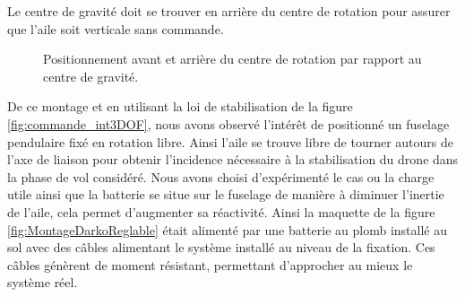 {Le centre de gravité doit se trouver en arrière du centre de rotation pour assurer que l'aile soit verticale sans commande.
\begin{figure}[ht!]
    \centering
    \caption{Positionnement avant et arrière du centre de rotation par rapport au centre de gravité.}
    \label{fig:MontageDarkoReglableAvArr}
\end{figure}

De ce montage et en utilisant la loi de stabilisation de la figure \ref{fig:commande_int3DOF}, nous avons observé l'intérêt de positionné un fuselage pendulaire fixé en rotation libre. Ainsi l'aile se trouve libre de tourner autours de l'axe de liaison pour obtenir l'incidence nécessaire à la stabilisation du drone dans la phase de vol considéré. Nous avons choisi d'expérimenté le cas ou la charge utile ainsi que la batterie se situe sur le fuselage de manière à diminuer l'inertie de l'aile, cela permet d'augmenter sa réactivité. Ainsi la maquette de la figure \ref{fig:MontageDarkoReglable} était alimenté par une batterie au plomb installé au sol avec des câbles alimentant le système installé au niveau de la fixation. Ces câbles génèrent de moment résistant, permettant d'approcher au mieux le système réel.

}
